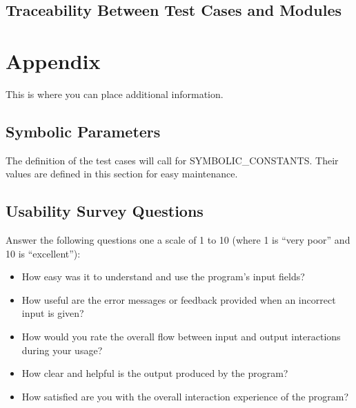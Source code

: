 \documentclass[12pt, titlepage]{article}
\begin{document}
\subsection{Traceability Between Test Cases and Modules}


\newpage





\newpage

\section{Appendix}

This is where you can place additional information.

\subsection{Symbolic Parameters}

The definition of the test cases will call for SYMBOLIC\_CONSTANTS.
Their values are defined in this section for easy maintenance.

\subsection{Usability Survey Questions} \label{use_survey}
Answer the following questions one a scale of 1 to 10 (where 1 is ``very poor'' and 10 is ``excellent''):
\begin{itemize}
  \item How easy was it to understand and use the program's input fields?
  \item How useful are the error messages or feedback provided when an incorrect input is given?
  \item How would you rate the overall flow between input and output interactions during your usage?
  \item How clear and helpful is the output produced by the program?
  \item How satisfied are you with the overall interaction experience of the program?
\end{itemize}
\end{document}
